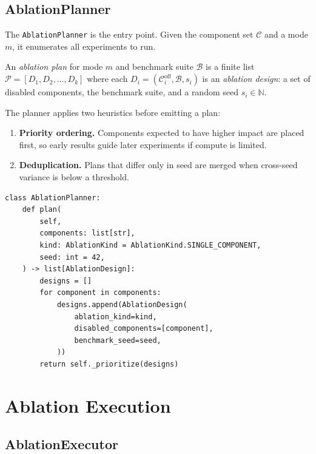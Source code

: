 \documentclass[11pt]{article}
\newcommand{\CompSet}{\mathcal{C}}          %
\begin{document}
\subsection{AblationPlanner}
\label{subsec:planner}

The \texttt{AblationPlanner} is the entry point.  Given the component
set $\CompSet$ and a mode $m$, it enumerates all experiments to run.

\begin{definition}
\label{def:ablation-plan}
An \emph{ablation plan} for mode $m$ and benchmark suite $\mathcal{B}$
is a finite list
$\mathcal{P} = [D_1, D_2, \ldots, D_k]$
where each $D_i = (\CompSet_i^{\mathrm{off}}, \mathcal{B}, s_i)$ is an
\emph{ablation design}: a set of disabled components, the benchmark
suite, and a random seed $s_i \in \mathbb{N}$.
\end{definition}

The planner applies two heuristics before emitting a plan:
\begin{enumerate}
\item \textbf{Priority ordering.}  Components expected to have higher
  impact are placed first, so early results guide later experiments
  if compute is limited.
\item \textbf{Deduplication.}  Plans that differ only in seed are
  merged when cross-seed variance is below a threshold.
\end{enumerate}

\begin{lstlisting}[style=jugeo-python,caption={AblationPlanner.plan (ablation\_design.py)}]
class AblationPlanner:
    def plan(
        self,
        components: list[str],
        kind: AblationKind = AblationKind.SINGLE_COMPONENT,
        seed: int = 42,
    ) -> list[AblationDesign]:
        designs = []
        for component in components:
            designs.append(AblationDesign(
                ablation_kind=kind,
                disabled_components=[component],
                benchmark_seed=seed,
            ))
        return self._prioritize(designs)
\end{lstlisting}

\section{Ablation Execution}
\label{sec:execution}

\subsection{AblationExecutor}
\label{subsec:executor}
\end{document}
